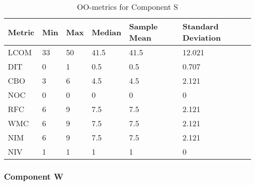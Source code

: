 \begin{table}[]
\centering
\caption{OO-metrics for Component S}
\label{tab:oometrics-sys}
\begin{tabular}{|l|l|l|l|l|l|}
\hline
\textbf{Metric} & \textbf{Min} & \textbf{Max} & \textbf{Median} & \textbf{Sample Mean} & \textbf{Standard Deviation} \\ \hline
LCOM            & 33           & 50           & 41.5            & 41.5                 & 12.021                      \\ \hline
DIT             & 0            & 1            & 0.5             & 0.5                  & 0.707                       \\ \hline
CBO             & 3            & 6            & 4.5             & 4.5                  & 2.121                       \\ \hline
NOC             & 0            & 0            & 0               & 0                    & 0                           \\ \hline
RFC             & 6            & 9            & 7.5             & 7.5                  & 2.121                       \\ \hline
WMC             & 6            & 9            & 7.5             & 7.5                  & 2.121                       \\ \hline
NIM             & 6            & 9            & 7.5             & 7.5                  & 2.121                       \\ \hline
NIV             & 1            & 1            & 1               & 1                    & 0                           \\ \hline
\end{tabular}
\end{table}





\subsubsection{Component W}

